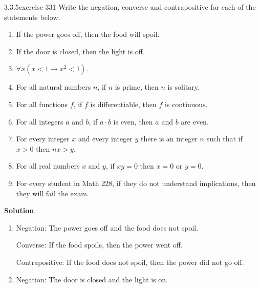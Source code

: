 \documentclass[twoside,11pt,]{book}
\numberwithin{equation}{chapter}
\newcommand{\imp}{\rightarrow}
\newcommand{\lt}{<}
\begin{document}
\begin{divisionsolution}{3.3.5}{}{exercise-331}%
\hypertarget{p-4229}{}%
Write the negation, converse and contrapositive for each of the statements below.\leavevmode%
\begin{enumerate}[label=(\alph*)]
\item\hypertarget{li-2150}{}\hypertarget{p-4230}{}%
If the power goes off, then the food will spoil.%
\item\hypertarget{li-2151}{}\hypertarget{p-4231}{}%
If the door is closed, then the light is off.%
\item\hypertarget{li-2152}{}\(\forall x (x \lt 1 \imp x^2 \lt 1)\).%
\item\hypertarget{li-2153}{}\hypertarget{p-4232}{}%
For all natural numbers \(n\), if \(n\) is prime, then \(n\) is solitary.%
\item\hypertarget{li-2154}{}\hypertarget{p-4233}{}%
For all functions \(f\), if \(f\) is differentiable, then \(f\) is continuous.%
\item\hypertarget{li-2155}{}\hypertarget{p-4234}{}%
For all integers \(a\) and \(b\), if \(a\cdot b\) is even, then \(a\) and \(b\) are even.%
\item\hypertarget{li-2156}{}\hypertarget{p-4235}{}%
For every integer \(x\) and every integer \(y\) there is an integer \(n\) such that if \(x > 0\) then \(nx > y\).%
\item\hypertarget{li-2157}{}\hypertarget{p-4236}{}%
For all real numbers \(x\) and \(y\), if \(xy = 0\) then \(x = 0\) or \(y = 0\).%
\item\hypertarget{li-2158}{}\hypertarget{p-4237}{}%
For every student in Math 228, if they do not understand implications, then they will fail the exam.%
\end{enumerate}
%
\par\smallskip%
\noindent\textbf{Solution}.\quad%
\hypertarget{p-4238}{}%
\leavevmode%
\begin{enumerate}[label=(\alph*)]
\item\hypertarget{li-2159}{}\hypertarget{p-4239}{}%
Negation: The power goes off and the food does not spoil.%
\par
\hypertarget{p-4240}{}%
Converse: If the food spoils, then the power went off.%
\par
\hypertarget{p-4241}{}%
Contrapositive: If the food does not spoil, then the power did not go off.%
\item\hypertarget{li-2160}{}\hypertarget{p-4242}{}%
Negation: The door is closed and the light is on.%
\par

\end{enumerate}
\end{divisionsolution}
\end{document}
